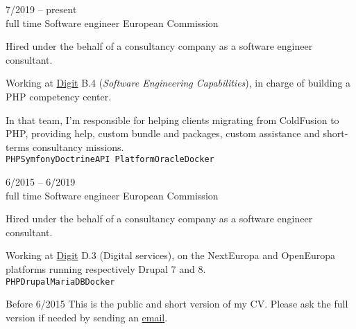 \begin{entrylist}
	\entry
		{7/2019 -- present\\\footnotesize{full time}}
		{Software engineer}
        {European Commission}
        {
			Hired under the behalf of a consultancy company as a software engineer consultant.

			Working at \href{https://ec.europa.eu/info/departments/informatics_en}{Digit} B.4 (\textit{Software Engineering Capabilities}),
			in charge of building a PHP competency center.

			In that team, I'm responsible for helping clients migrating from ColdFusion to PHP, providing help,
			custom bundle and packages, custom assistance and short-terms consultancy missions.
			\\ \texttt{PHP}\slashsep\texttt{Symfony}\slashsep\texttt{Doctrine}\slashsep\texttt{API Platform}\slashsep\texttt{Oracle}\slashsep\texttt{Docker}
        }
	\entry
		{6/2015 -- 6/2019\\\footnotesize{full time}}
		{Software engineer}
        {European Commission}
        {
			Hired under the behalf of a consultancy company as a software engineer consultant.

			Working at \href{https://ec.europa.eu/info/departments/informatics_en}{Digit} D.3 (Digital services),
			on the NextEuropa and OpenEuropa platforms running respectively Drupal 7 and 8.
			\\ \texttt{PHP}\slashsep\texttt{Drupal}\slashsep\texttt{MariaDB}\slashsep\texttt{Docker}
        }
    \entry
        {\color{black!50}Before 6/2015}
        {}
        {}
        {\footnotesize{\color{black!50}This is the public and short version of my CV. Please ask the full version if needed by sending an \href{mailto:pol.dellaiera@protonmail.com}{email}.}}
\end{entrylist}


